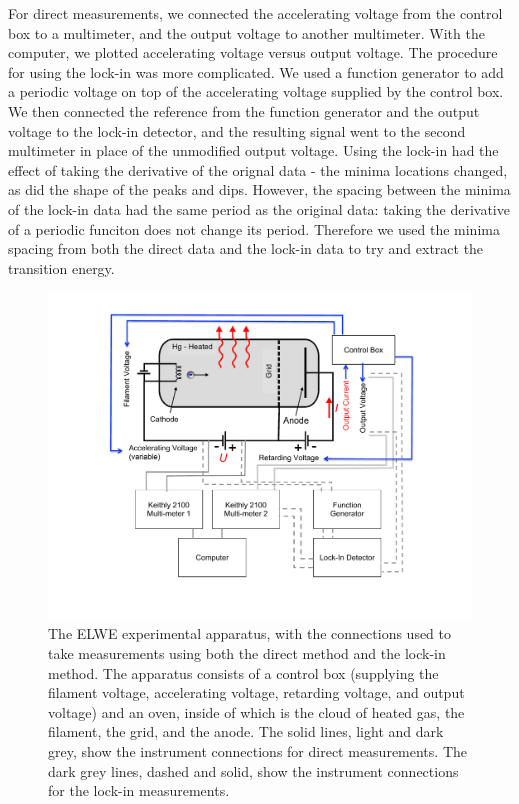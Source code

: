 \documentclass[prb,preprint]{revtex4-1}
\begin{document}
For direct measurements, we connected the accelerating voltage from the control box to a multimeter, and the output voltage to another multimeter. 
With the computer, we plotted accelerating voltage versus output voltage. 
The procedure for using the lock-in was more complicated. 
We used a function generator to add a periodic voltage on top of the accelerating voltage supplied by the control box. 
We then connected the reference from the function generator and the output voltage to the lock-in detector, and the resulting signal went to the second multimeter in place of the unmodified output voltage. 
Using the lock-in had the effect of taking the derivative of the orignal data - the minima locations changed, as did the shape of the peaks and dips. 
However, the spacing between the minima of the lock-in data had the same period as the original data: taking the derivative of a periodic funciton does not change its period. 
Therefore we used the minima spacing from both the direct data and the lock-in data to try and extract the transition energy. 

\begin{figure}[h!]
\centering
\includegraphics[width=5in]{set-up.pdf} %
\caption{The ELWE experimental apparatus, with the connections used to take measurements using both the direct method and the lock-in method. The apparatus consists of a control box (supplying the filament voltage, accelerating voltage, retarding voltage, and output voltage) and an oven, inside of which is the cloud of heated gas, the filament, the grid, and the anode. The solid lines, light and dark grey, show the instrument connections for direct measurements. The dark grey lines, dashed and solid, show the instrument connections for the lock-in measurements. }
\label{set-up}
\end{figure}
\end{document}
